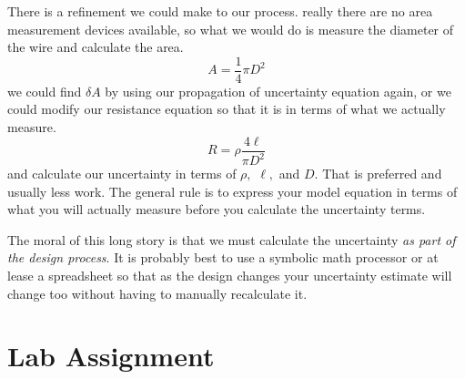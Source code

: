 There is a refinement we could make to our process. really there are no area
measurement devices available, so what we would do is measure the diameter
of the wire and calculate the area.%
\begin{equation*}
A=\frac{1}{4}\pi D^{2}
\end{equation*}%
we could find $\delta A$ by using our propagation of uncertainty equation
again, or we could modify our resistance equation so that it is in terms of
what we actually measure.%
\begin{equation*}
R=\rho \frac{4\ell }{\pi D^{2}}
\end{equation*}%
and calculate our uncertainty in terms of $\rho ,$ $\ell ,$ and $D.$ That is
preferred and usually less work. The general rule is to express your model
equation in terms of what you will actually measure before you calculate the
uncertainty terms.

The moral of this long story is that we must calculate the uncertainty \emph{%
as part of the design process}. It is probably best to use a symbolic math
processor or at lease a spreadsheet so that as the design changes your
uncertainty estimate will change too without having to manually recalculate
it.

\vspace*{\fill}%
\pagebreak

\section{Lab Assignment}

